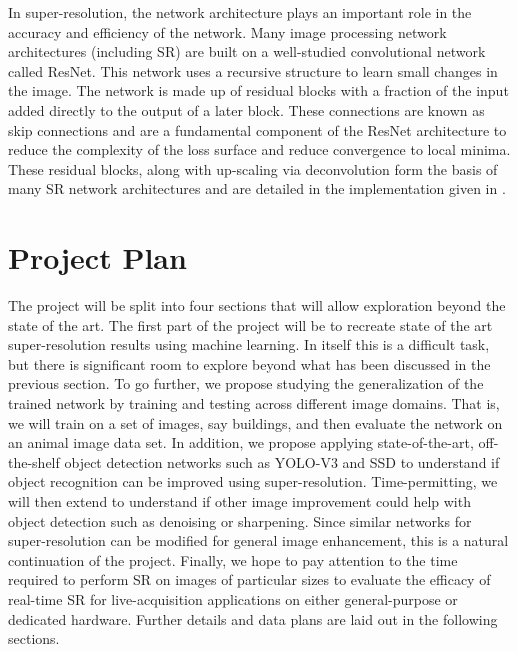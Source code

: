 \documentclass{article}
\begin{document}
In super-resolution, the network architecture plays an important role in the accuracy and efficiency of the network. Many image processing network architectures (including SR) are built on a well-studied convolutional network called ResNet. This network uses a recursive structure to learn small changes in the image. The network is made up of residual blocks with a fraction of the input added directly to the output of a later  block. These connections are known as skip connections and are a fundamental component of the ResNet architecture \cite{he2016deep} to reduce the complexity of the loss surface and reduce convergence to local minima. These residual blocks, along with up-scaling via deconvolution form the basis of many SR network architectures \cite{yang2019deep} and are detailed in the implementation given in \cite{lim2017enhanced}.

\section{Project Plan}
The project will be split into four sections that will allow exploration beyond the state of the art. The first part of the project will be to recreate state of the art super-resolution results using machine learning. In itself this is a difficult task, but there is significant room to explore beyond what has been discussed in the previous section. To go further, we propose studying the generalization of the trained network by training and testing across different image domains. That is, we will train on a set of images, say buildings, and then evaluate the network on an animal image data set. In addition, we propose applying state-of-the-art, off-the-shelf object detection networks such as YOLO-V3 \cite{redmon2018yolov3} and SSD \cite{liu2016ssd} to understand if object recognition can be improved using super-resolution. Time-permitting, we will then extend to understand if other image improvement could help with object detection such as denoising or sharpening. Since similar networks for super-resolution can be modified for general image enhancement, this is a natural continuation of the project. Finally, we hope to pay attention to the time required to perform SR on images of particular sizes to evaluate the efficacy of real-time SR for live-acquisition applications on either general-purpose or dedicated hardware. Further details and data plans are laid out in the following sections.
\end{document}
